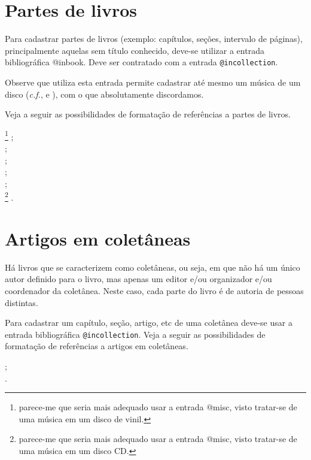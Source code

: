 \begin{apendicesenv}
\section{Partes de livros}
\label{sec:inbooks}


Para cadastrar partes de livros (exemplo: capítulos, seções, intervalo de páginas), principalmente aquelas sem título conhecido, deve-se utilizar a entrada bibliográfica {\ttfamily @inbook}. Deve ser contratado com a entrada \verb|@incollection|.

Observe que  utiliza esta entrada permite cadastrar até mesmo um música de um disco (\textit{c.f.},  e ), com o que absolutamente discordamos.

Veja a seguir as possibilidades de formatação de referências a partes de livros.


{\small
    \cite{Alcionep1988a}\footnote{parece-me que seria mais adequado usar a entrada {\ttfamily @misc}, visto tratar-se de uma música em um disco de vinil.} ;\\
    \cite{brasil1994} ;\\
    \cite{priberam1998} ;\\
    \cite{santos1994} ;\\
    \cite{secretaria1999} ;\\
    \cite{simonej1977}\footnote{parece-me que seria mais adequado usar a entrada {\ttfamily @misc}, visto tratar-se de uma música em um disco CD.} .\\
}



\section{Artigos em coletâneas}
\label{sec:incollection}


Há livros que se caracterizem como coletâneas, ou seja, em que não há um único autor definido para o livro, mas apenas um editor e/ou organizador e/ou coordenador da coletânea. Neste caso, cada parte do livro é de autoria de pessoas distintas.

Para cadastrar um capítulo, seção, artigo, etc de uma coletânea deve-se usar a entrada bibliográfica \verb|@incollection|. Veja a seguir as possibilidades de formatação de referências a artigos em coletâneas.


{\small
    \cite{rego1991} ;\\
    \cite{romano1996}.\\
}




\end{apendicesenv}
